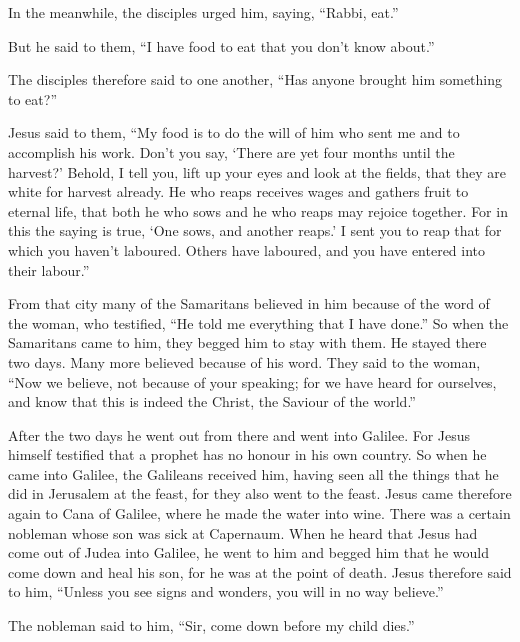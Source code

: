  In the meanwhile, the disciples urged him, saying,
``Rabbi, eat.''

 But he said to them, ``I have food to eat that you don't
know about.''

 The disciples therefore said to one another, ``Has
anyone brought him something to eat?''

 Jesus said to them, ``My food is to do the will of him
who sent me and to accomplish his work.  Don't you say,
`There are yet four months until the harvest?' Behold, I tell you, lift
up your eyes and look at the fields, that they are white for harvest
already.  He who reaps receives wages and gathers fruit
to eternal life, that both he who sows and he who reaps may rejoice
together.  For in this the saying is true, `One sows, and
another reaps.'  I sent you to reap that for which you
haven't laboured. Others have laboured, and you have entered into their
labour.''

 From that city many of the Samaritans believed in him
because of the word of the woman, who testified, ``He told me everything
that I have done.''  So when the Samaritans came to him,
they begged him to stay with them. He stayed there two days.
 Many more believed because of his word. 
They said to the woman, ``Now we believe, not because of your speaking;
for we have heard for ourselves, and know that this is indeed the
Christ, the Saviour of the world.''

 After the two days he went out from there and went into
Galilee.  For Jesus himself testified that a prophet has
no honour in his own country.  So when he came into
Galilee, the Galileans received him, having seen all the things that he
did in Jerusalem at the feast, for they also went to the feast.
 Jesus came therefore again to Cana of Galilee, where he
made the water into wine. There was a certain nobleman whose son was
sick at Capernaum.  When he heard that Jesus had come out
of Judea into Galilee, he went to him and begged him that he would come
down and heal his son, for he was at the point of death. 
Jesus therefore said to him, ``Unless you see signs and wonders, you
will in no way believe.''

 The nobleman said to him, ``Sir, come down before my
child dies.''

